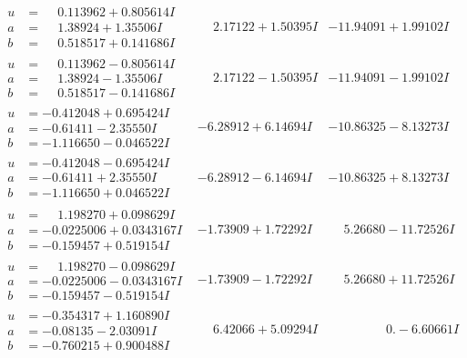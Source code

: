 \documentclass[1p]{elsarticle_modified}
\theoremstyle{definition}
\begin{document}
$$\begin{array}{c|c|c}
\begin{aligned}
u &= \phantom{-}0.113962 + 0.805614 I \\
a &= \phantom{-}1.38924 + 1.35506 I \\
b &= \phantom{-}0.518517 + 0.141686 I\end{aligned}
 & \phantom{-}2.17122 + 1.50395 I & -11.94091 + 1.99102 I \\ \hline\begin{aligned}
u &= \phantom{-}0.113962 - 0.805614 I \\
a &= \phantom{-}1.38924 - 1.35506 I \\
b &= \phantom{-}0.518517 - 0.141686 I\end{aligned}
 & \phantom{-}2.17122 - 1.50395 I & -11.94091 - 1.99102 I \\ \hline\begin{aligned}
u &= -0.412048 + 0.695424 I \\
a &= -0.61411 - 2.35550 I \\
b &= -1.116650 - 0.046522 I\end{aligned}
 & -6.28912 + 6.14694 I & -10.86325 - 8.13273 I \\ \hline\begin{aligned}
u &= -0.412048 - 0.695424 I \\
a &= -0.61411 + 2.35550 I \\
b &= -1.116650 + 0.046522 I\end{aligned}
 & -6.28912 - 6.14694 I & -10.86325 + 8.13273 I \\ \hline\begin{aligned}
u &= \phantom{-}1.198270 + 0.098629 I \\
a &= -0.0225006 + 0.0343167 I \\
b &= -0.159457 + 0.519154 I\end{aligned}
 & -1.73909 + 1.72292 I & \phantom{-}5.26680 - 11.72526 I \\ \hline\begin{aligned}
u &= \phantom{-}1.198270 - 0.098629 I \\
a &= -0.0225006 - 0.0343167 I \\
b &= -0.159457 - 0.519154 I\end{aligned}
 & -1.73909 - 1.72292 I & \phantom{-}5.26680 + 11.72526 I \\ \hline\begin{aligned}
u &= -0.354317 + 1.160890 I \\
a &= -0.08135 - 2.03091 I \\
b &= -0.760215 + 0.900488 I\end{aligned}
 & \phantom{-}6.42066 + 5.09294 I & \phantom{-0.000000 } 0. - 6.60661 I \\ \hline\begin{aligned}

\end{aligned}
\end{array}$$
\end{document}
